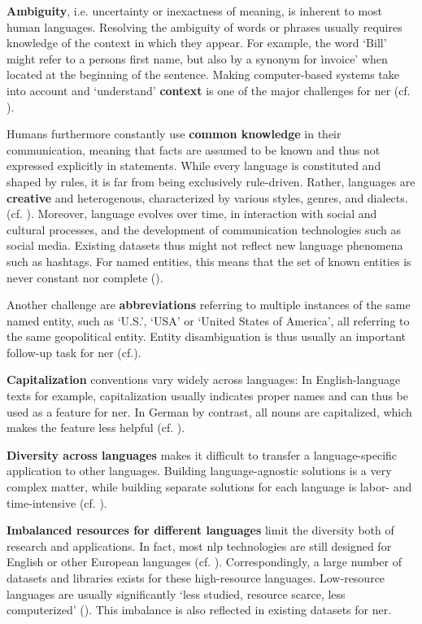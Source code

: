 \textbf{Ambiguity}, i.e. uncertainty or inexactness of meaning, is inherent to most human languages. Resolving the ambiguity of words or phrases usually requires knowledge of the context in which they appear.  For example, the word `Bill' might refer to a persons first name, but also by a synonym for ìnvoice' when located at the beginning of the sentence.
Making computer-based systems take into account and `understand' \textbf{context} is one of the major challenges for \gls{ner} (cf.  \cite[386]{aggarwal_machine_2018}).  

Humans furthermore constantly use \textbf{common knowledge} in their communication, meaning that facts are assumed to be known and thus not expressed explicitly in statements. 
While every language is constituted and shaped by rules, it is far from being exclusively rule-driven. Rather, languages are \textbf{creative} and heterogenous, characterized by various styles, genres, and dialects.(cf. \cite[14]{vajjala_practical_2020}). Moreover, language evolves over time, in interaction with social and cultural processes, and the development of communication technologies such as social media. Existing datasets thus might not reflect new language phenomena such as hashtags.
For named entities, this means that the set of known entities is never constant nor complete (\cite[386]{aggarwal_machine_2018}). 

Another challenge are \textbf{abbreviations} referring to multiple instances of the same named entity, such as `U.S.', `USA' or `United States of America', all referring to the same geopolitical entity. Entity disambiguation is thus usually an important follow-up task for \gls{ner} (cf.\cite[387]{aggarwal_machine_2018}). 

\textbf{Capitalization} conventions vary widely across languages: In English-language texts for example, capitalization usually indicates proper names and can thus be used as a feature for \gls{ner}. In German by contrast, all nouns are capitalized, which makes the feature less helpful (cf. \cite{benikova-etal-2014-nosta}).

\textbf{Diversity across languages} makes it difficult to transfer a language-specific application to other languages. 
Building language-agnostic solutions is a very complex matter, while building separate solutions for each language is labor- and time-intensive (cf. \cite[14]{vajjala_practical_2020}).

\textbf{Imbalanced resources for different languages} limit the diversity both of research and applications. In fact, most \gls{nlp} technologies are still designed for English or other European languages (cf. \cite{singh_natural_2008}). Correspondingly, a large number of datasets and libraries exists for these high-resource languages. Low-resource languages are usually significantly `less studied, resource scarce, less computerized' (\cite{magueresse_low-resource_2020}). This imbalance is also reflected in existing datasets for \gls{ner}. 

